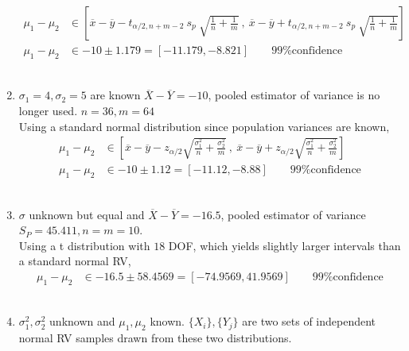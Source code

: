 \begin{enumerate}
		\begin{align}
			\mu_1 - \mu_2 &\in \left[ \overline{x} - \overline{y} - t_{\alpha / 2, n+m-2}\ s_p\ \sqrt{\frac{1}{n} + \frac{1}{m}}\ ,\ \overline{x} - \overline{y} + t_{\alpha / 2, n+m-2}\ s_p\ \sqrt{\frac{1}{n} + \frac{1}{m}} \right]  \nonumber \\
			\mu_1 - \mu_2 &\in -10 \pm 1.179 = [-11.179, -8.821] \qquad \text{99\% confidence}  
		\end{align}\\
	
	
	\item  $ \sigma_1 = 4, \sigma_2 = 5 $ are known  $ \overline{X} - \overline{Y} = -10 $, pooled estimator of variance is no longer used. $n = 36, m = 64$ \\
	Using a standard normal distribution since population variances are known,\\
	
		\begin{align}
			\mu_1 - \mu_2 &\in \left[ \overline{x} - \overline{y} - z_{\alpha / 2} \sqrt{\frac{\sigma_1^2}{n} + \frac{\sigma_2^2}{m}}\ ,\ \overline{x} - \overline{y} + z_{\alpha / 2} \sqrt{\frac{\sigma_1^2}{n} + \frac{\sigma_2^2}{m}} \right]   \nonumber \\
			\mu_1 - \mu_2 &\in -10 \pm 1.12 = [-11.12, -8.88] \qquad \text{99\% confidence}  
		\end{align}\\
	
	
	
	\item  $ \sigma $ unknown but equal and $ \overline{X} - \overline{Y} = -16.5 $, pooled estimator of variance $ S_P = 45.411, n = m = 10$. \\
	
	Using a t distribution with $ 18 $ DOF, which yields slightly larger intervals than a standard normal RV,\\
	
		\begin{align}		
			\mu_1 - \mu_2 &\in -16.5 \pm 58.4569 = [-74.9569, 41.9569] \qquad \text{99\% confidence}
		\end{align}\\
	
	
	\item  $ \sigma_1^2, \sigma_2^2 $ unknown and $ \mu_1, \mu_2 $ known. $ \{X_i\}, \{Y_j\} $ are two sets of independent normal RV samples drawn from these two distributions. \\
	

\end{enumerate}
